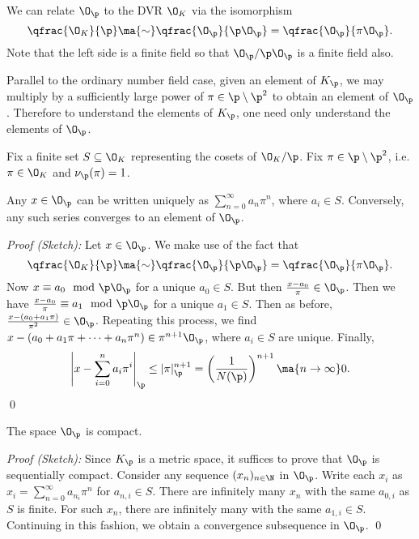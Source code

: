 \begin{rem}
We can relate $\O_\p$ to the DVR $\O_K$ via the isomorphism
	\[
	\qfrac{\O_K}{\p} \ma{\sim} \qfrac{\O_\p}{\p \O_\p} = \qfrac{\O_\p}{\pi \O_\p}.
	\]
Note that the left side is a finite field so that $\O_\p/\p\O_\p$ is a finite field also. 
\end{rem}

Parallel to the ordinary number field case, given an element of $K_\p$, we may multiply by a sufficiently large power of $\pi \in \p \setminus \p^2$ to obtain an element of $\O_\p$. Therefore to understand the elements of $K_\p$, one need only understand the elements of $\O_\p$. 

Fix a finite set $S \subseteq \O_K$ representing the cosets of $\O_K/\p$. Fix $\pi \in \p \setminus \p^2$, i.e. $\pi \in \O_K$ and $\nu_\p(\pi)=1$. 


\begin{thm}
Any $x \in \O_\p$ can be written uniquely as $\displaystyle\sum_{n=0}^\infty a_n \pi^n$, where $a_i \in S$. Conversely, any such series converges to an element of $\O_\p$. 
\end{thm}

\noindent \emph{Proof (Sketch): } Let $x \in \O_\p$. We make use of the fact that
	\[
	\qfrac{\O_K}{\p} \ma{\sim} \qfrac{\O_\p}{\p \O_\p} = \qfrac{\O_\p}{\pi \O_\p}.
	\]
Now $x \equiv a_0 \mod \p\O_\p$ for a unique $a_0 \in S$. But then $\frac{x-a_0}{\pi} \in \O_\p$. Then we have $\frac{x-a_0}{\pi} \equiv a_1 \mod \p \O_\p$ for a unique $a_1 \in S$. Then as before, $\frac{x-(a_0+a_1\pi)}{\pi^2} \in \O_\p$. Repeating this process, we find $x-(a_0+a_1\pi+\cdots+a_n\pi^n) \in \pi^{n+1} \O_\p$, where $a_i \in S$ are unique. Finally,
	\[
	\left| x - \sum_{i=0}^n a_i \pi^i \right|_\p \leq |\pi|_\p^{n+1} = \left(\dfrac{1}{N(\p)}\right)^{n+1} \ma{n \to \infty} 0. 
	\] \qed \\


\begin{prop}
The space $\O_\p$ is compact. 
\end{prop}

\noindent \emph{Proof (Sketch): } Since $K_\p$ is a metric space, it suffices to prove that $\O_\p$ is sequentially compact. Consider any sequence $(x_n)_{n \in \N}$ in $\O_\p$. Write each $x_i$ as $\displaystyle x_i = \sum_{n=0}^\infty a_{n_i} \pi^n$ for $a_{n,i} \in S$. There are infinitely many $x_n$ with the same $a_{0,i}$ as $S$ is finite. For such $x_n$, there are infinitely many with the same $a_{1,i} \in S$. Continuing in this fashion, we obtain a convergence subsequence in $\O_\p$. \qed \\

